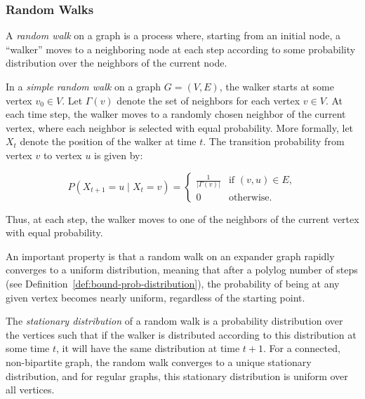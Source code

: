 \subsubsection{Random Walks} 
    
A \textit{random walk} on a graph is a process where, starting from an initial node, a ``walker'' moves to a neighboring node at each step according to some probability distribution over the neighbors of the current node. 

\begin{definition}  \label{def:simp-random-walk}
    In a \textit{simple random walk} on a graph $G = (V, E)$, the walker starts at some vertex $v_0 \in V$. Let $\Gamma(v)$ denote the set of neighbors for each vertex $v \in V$. At each time step, the walker moves to a randomly chosen neighbor of the current vertex, where each neighbor is selected with equal probability. More formally, let $X_t$ denote the position of the walker at time $t$. The transition probability from vertex $v$ to vertex $u$ is given by:
    
    $$
    P(X_{t+1} = u \mid X_t = v) =
    \begin{cases}
    \frac{1}{|\Gamma(v)|} & \text{if } (v, u) \in E, \\
    0 & \text{otherwise}.
    \end{cases}
    $$
    
    Thus, at each step, the walker moves to one of the neighbors of the current vertex with equal probability.
\end{definition}

An important property is that a random walk on an expander graph rapidly converges to a uniform distribution, meaning that after a polylog number of steps (see Definition~\ref{def:bound-prob-distribution}), the probability of being at any given vertex becomes nearly uniform, regardless of the starting point.

\begin{definition}  \label{stationary-distribution}
    The \textit{stationary distribution} of a random walk is a probability distribution over the vertices such that if the walker is distributed according to this distribution at some time $t$, it will have the same distribution at time $t+1$. For a connected, non-bipartite graph, the random walk converges to a unique stationary distribution, and for regular graphs, this stationary distribution is uniform over all vertices.
\end{definition}

